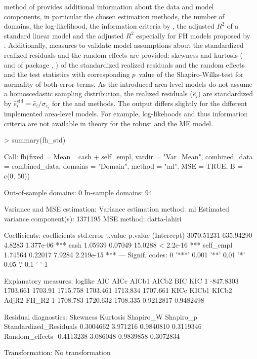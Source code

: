 method of  provides additional information about the data and model
components, in particular the chosen estimation methods, the number of domains,
the log-likelihood, the information criteria by \citet{Marhuenda2014}, the adjusted $R^2$ of a standard linear model and the adjusted $R^2$ especially for FH models proposed by \citet{Lahiri2015}. Additionally, measures to
validate model assumptions about the standardized realized residuals and the
random effects are provided: skewness and kurtosis ( and
 of package , ) of the
standardized realized residuals and the random effects and the test statistics
with corresponding $p$~value of the Shapiro-Wilks-test for normality of both error
terms. As the introduced area-level models do not assume a homoscedastic sampling
distribution, the realized residuals
($\hat{e}_i$) are standardized by $\hat{e}_i^{\text{std}} = \hat{e}_i / \sigma_{e_{i}}$ for the  and  methods.
The  output differs slightly for the different implemented
area-level models. For example, log-likehoods and thus information criteria are
not available in theory for the robust and the ME model.
\begin{example}
> summary(fh_std)

Call:
fh(fixed = Mean ~ cash + self_empl, vardir = "Var_Mean",
    combined_data = combined_data,
    domains = "Domain", method = "ml", MSE = TRUE, B = c(0, 50))

Out-of-sample domains: 0
In-sample domains: 94

Variance and MSE estimation:
Variance estimation method: ml
Estimated variance component(s): 1371195
MSE method: datta-lahiri

Coefficients:
           coefficients std.error  t.value   p.value
(Intercept)  3070.51231 635.94290   4.8283 1.377e-06 ***
cash            1.05939   0.07049  15.0288 < 2.2e-16 ***
self_empl       1.74564   0.22017   7.9284 2.219e-15 ***
---
Signif. codes: 0 '***' 0.001 '**' 0.01 '*' 0.05 '.' 0.1 ' ' 1

Explanatory measures:
    loglike      AIC    AICc    AICb1    AICb2      BIC      KIC
1 -847.8303 1703.661 1703.91 1715.758 1703.461 1713.834 1707.661
      KICc    KICb1    KICb2     AdjR2     FH_R2
1 1708.783 1720.632 1708.335 0.9212817 0.9482498

Residual diagnostics:
                         Skewness Kurtosis Shapiro_W Shapiro_p
Standardized_Residuals  0.3004662 3.971216 0.9840810 0.3119346
Random_effects         -0.4113238 3.086048 0.9839858 0.3072834

Transformation: No transformation
\end{example}
